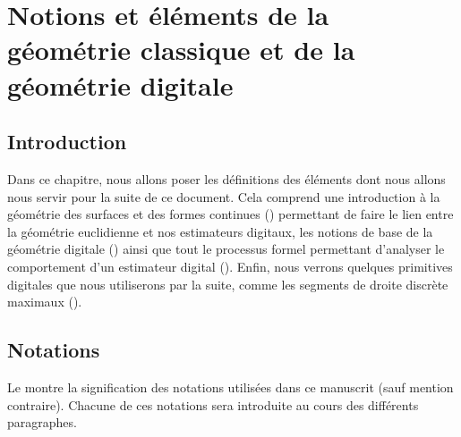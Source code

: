 %
\chapter{Notions et éléments de la géométrie classique et de la géométrie digitale}
\label{sec:notions}


\setcounter{minitocdepth}{3}
\minitoc

\newpage
%
\section{Introduction}
%
Dans ce chapitre, nous allons poser les définitions des éléments dont nous
allons nous servir pour la suite de ce document. Cela comprend une introduction à
la géométrie des surfaces et des formes continues () permettant
de faire le lien entre la géométrie euclidienne et nos estimateurs digitaux, les
notions de base de la géométrie digitale () ainsi
que tout le processus formel permettant d'analyser le comportement d'un estimateur
digital (). Enfin, nous verrons
quelques primitives digitales que nous utiliserons par la suite, comme les
segments de droite discrète maximaux ().
%
\section{Notations}
%
Le  montre la signification des notations utilisées dans
ce manuscrit (sauf mention contraire). Chacune de ces notations sera introduite
au cours des différents paragraphes.

